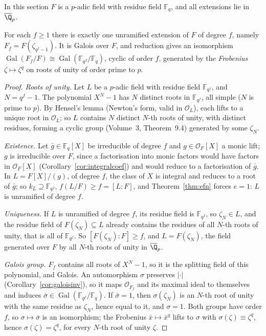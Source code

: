 In this section $F$ is a $p$-adic field with residue field $\mathbb F_q$, and all extensions lie in $\overline{\Q}_p$.

\begin{theorem}\label{thm:unram}
For each $f\ge1$ there is exactly one unramified extension of $F$ of degree $f$, namely $F_f=F(\zeta_{q^f-1})$. It is Galois
over $F$, and reduction gives an isomorphism $\operatorname{Gal}(F_f/F)\cong\operatorname{Gal}(\mathbb F_{q^f}/\mathbb F_q)$,
cyclic of order $f$, generated by the \emph{Frobenius} $\zeta\mapsto\zeta^q$ on roots of unity of order prime to $p$.
\end{theorem}
\begin{proof}
\emph{Roots of unity.} Let $L$ be a $p$-adic field with residue field $\mathbb F_{q^f}$, and $N=q^f-1$. The polynomial $X^N-1$
has $N$ distinct roots in $\mathbb F_{q^f}$, all simple ($N$ is prime to $p$). By Hensel's lemma (Newton's form, valid in $\mathcal
O_L$), each lifts to a unique root in $\mathcal O_L$; so $L$ contains $N$ distinct $N$-th roots of unity, with distinct
residues, forming a cyclic group (Volume~3, Theorem~9.4) generated by some $\zeta_N$.

\emph{Existence.} Let $\bar g\in\mathbb F_q[X]$ be irreducible of degree $f$ and $g\in\mathcal O_F[X]$ a monic lift; $g$ is
irreducible over $F$, since a factorisation into monic factors would have factors in $\mathcal O_F[X]$ (Corollary~\ref{cor:integralcoef})
and would reduce to a factorisation of $\bar g$. In $L=F[X]/(g)$, of degree $f$, the class of $X$ is integral and reduces to a
root of $\bar g$; so $k_L\supseteq\mathbb F_{q^f}$, $f(L/F)\ge f=[L:F]$, and Theorem~\ref{thm:efn} forces $e=1$: $L$ is
unramified of degree $f$.

\emph{Uniqueness.} If $L$ is unramified of degree $f$, its residue field is $\mathbb F_{q^f}$, so $\zeta_N\in L$, and the residue
field of $F(\zeta_N)\subseteq L$ already contains the residues of all $N$-th roots of unity, that is all of $\mathbb F_{q^f}$. So
$[F(\zeta_N):F]\ge f$, and $L=F(\zeta_N)$, the field generated over $F$ by all $N$-th roots of unity in $\overline{\Q}_p$.

\emph{Galois group.} $F_f$ contains all roots of $X^N-1$, so it is the splitting field of this polynomial, and Galois.
An automorphism $\sigma$ preserves $|\cdot|$ (Corollary~\ref{cor:galoisinv}), so it maps $\mathcal O_{F_f}$ and its maximal ideal to
themselves and induces $\bar\sigma\in\operatorname{Gal}(\mathbb F_{q^f}/\mathbb F_q)$. If $\bar\sigma=1$, then $\sigma(\zeta_N)$ is an
$N$-th root of unity with the same residue as $\zeta_N$, hence equal to it, and $\sigma=1$. Both groups have order $f$, so
$\sigma\mapsto\bar\sigma$ is an isomorphism; the Frobenius $\bar x\mapsto\bar x^q$ lifts to $\sigma$ with $\sigma(\zeta)\equiv
\zeta^q$, hence $\sigma(\zeta)=\zeta^q$, for every $N$-th root of unity $\zeta$.
\end{proof}

